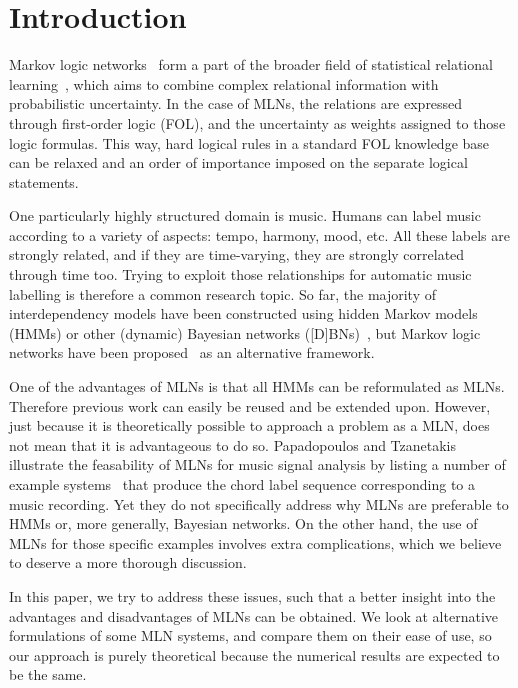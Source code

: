 \documentclass[letterpaper]{article} %
\begin{document}
\section{Introduction}
Markov logic networks~\cite{richardson2006ml} form a part of the broader field of statistical relational learning~\cite{getoor2007itsrl}, which aims to combine complex relational information with probabilistic uncertainty. In the case of MLNs, the relations are expressed through first-order logic (FOL), and the uncertainty as weights assigned to those logic formulas. This way, hard logical rules in a standard FOL knowledge base can be relaxed and an order of importance imposed on the separate logical statements.

One particularly highly structured domain is music. Humans can label music according to a variety of aspects: tempo, harmony, mood, etc. All these labels are strongly related, and if they are time-varying, they are strongly correlated through time too. Trying to exploit those relationships for automatic music labelling is therefore a common research topic. So far, the majority of interdependency models have been constructed using hidden Markov models (HMMs) or other (dynamic) Bayesian networks ([D]BNs)~\cite{mauch2010taslp,pauwels2013ismir,pauwels2014jnmr}, but Markov logic networks have been proposed~\cite{papadopoulos2012ismir,papadopoulos2013icassp,papadopoulos2017taslp} as an alternative framework. 

One of the advantages of MLNs is that all HMMs can be reformulated as MLNs. Therefore previous work can easily be reused and be extended upon. However, just because it is theoretically possible to approach a problem as a MLN, does not mean that it is advantageous to do so. Papadopoulos and Tzanetakis illustrate the feasability of MLNs for music signal analysis by listing a number of example systems~\cite{papadopoulos2012ismir,papadopoulos2013icassp,papadopoulos2017taslp} that produce the chord label sequence corresponding to a music recording. Yet they do not specifically address why MLNs are preferable to HMMs or, more generally, Bayesian networks. On the other hand, the use of MLNs for those specific examples involves extra complications, which we believe to deserve a more thorough discussion.

In this paper, we try to address these issues, such that a better insight into the advantages and disadvantages of MLNs can be obtained. We look at alternative formulations of some MLN systems, and compare them on their ease of use, so our approach is purely theoretical because the numerical results are expected to be the same.
\end{document}
